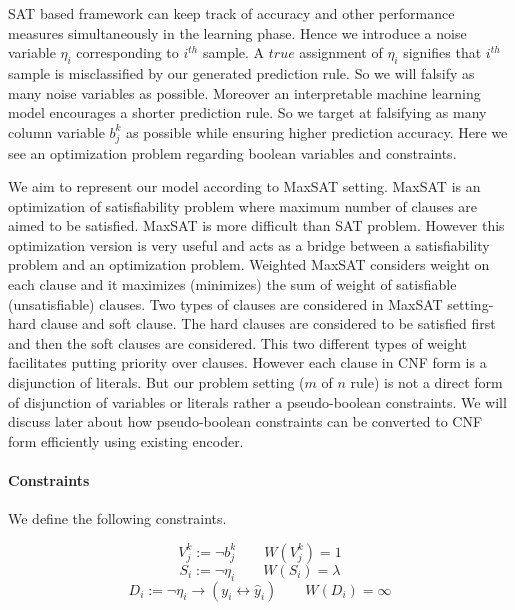 	SAT based framework can keep track of accuracy and other performance measures simultaneously in the learning phase. Hence we introduce a noise variable $ \eta_i $ corresponding to $ i^{th} $ sample. A $ true $ assignment of $ \eta_i $ signifies that $ i^{th} $ sample is misclassified by our generated prediction rule.  So we will falsify as many noise variables as possible. Moreover an interpretable machine learning model encourages a shorter prediction rule. So we target at falsifying as many column variable $ b_j^k $ as possible while ensuring higher prediction accuracy. Here we see an optimization problem regarding boolean variables and constraints. 
	
	
	We aim to represent our model according to MaxSAT setting. MaxSAT is an optimization of satisfiability problem where maximum number of clauses are aimed to be satisfied. MaxSAT is more difficult than SAT problem. However this optimization version is very useful and acts as a bridge between a satisfiability problem and an optimization problem. Weighted MaxSAT considers weight on each clause and it maximizes (minimizes) the sum of weight of satisfiable  (unsatisfiable) clauses. Two types of clauses are considered in MaxSAT setting- hard clause and soft clause. The hard clauses are  considered to be satisfied first and then the soft clauses are considered. This two different types of weight facilitates  putting priority over clauses. However each clause in CNF form is a disjunction of literals. But our problem setting ($ m $ of $ n $ rule) is not a direct form of disjunction of variables or literals rather a   pseudo-boolean  constraints. We will discuss later about how pseudo-boolean constraints can be converted to CNF form efficiently using existing encoder.
	
	\paragraph{Constraints}
	We define the following constraints.
	
	\begin{equation}
	V_j^k:=\neg b_{j}^k\qquad W(V_j^k)=1
	\label{eq:sparse_constraint}
	\end{equation}
	\begin{equation}
	S_i:=\neg \eta_i\qquad W(S_i)=\lambda
	\label{eq:noise_reduce}
	\end{equation}
	\begin{equation}
	D_i:=\neg \eta_i \rightarrow (y_i \leftrightarrow \hat{y}_i) \qquad W(D_i)=\infty
	\label{eq:classifier_prediction}
	\end{equation}
	
